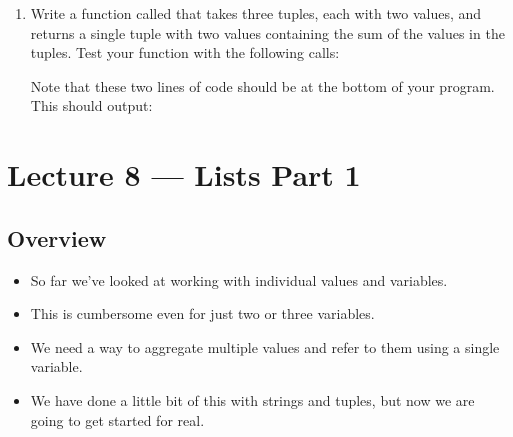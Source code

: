 \documentclass[letterpaper,10pt,english]{sphinxmanual}
\begin{document}
\begin{enumerate}
\item {} 
Write a function called  that takes three tuples,
each with two values, and returns a single tuple with two values
containing the sum of the values in the tuples.  Test your function
with the following calls:

\begin{sphinxVerbatim}[commandchars=\\\{\}]
     
     
\end{sphinxVerbatim}

Note that these two lines of code should be at the bottom of your
program.  This should output:

\begin{sphinxVerbatim}[commandchars=\\\{\}]
 
 
\end{sphinxVerbatim}

\end{enumerate}


\chapter{Lecture 8 — Lists Part 1}
\label{\detokenize{lecture_notes/lec08_lists1:lecture-8-lists-part-1}}\label{\detokenize{lecture_notes/lec08_lists1::doc}}

\section{Overview}
\label{\detokenize{lecture_notes/lec08_lists1:overview}}\begin{itemize}
\item {} 
So far we’ve looked at working with individual values and variables.

\item {} 
This is cumbersome even for just two or three variables.

\item {} 
We need a way to aggregate multiple values and refer to them using a
single variable.

\item {} 
We have done a little bit of this with strings and tuples, but now
we are going to get started for real.

\end{itemize}
\end{document}
